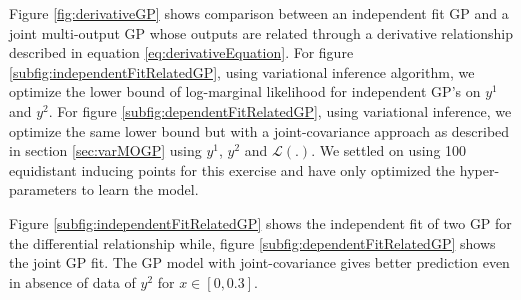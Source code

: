 Figure \ref{fig:derivativeGP} shows comparison between an independent fit GP and a joint multi-output GP whose outputs are related through a derivative relationship described in equation \ref{eq:derivativeEquation}. For figure \ref{subfig:independentFitRelatedGP}, using variational inference algorithm, we optimize the lower bound of log-marginal likelihood for independent GP's on \(y^{1}\) and \(y^{2}\). For figure \ref{subfig:dependentFitRelatedGP}, using variational inference, we optimize the same lower bound but with a joint-covariance approach as described in section \ref{sec:varMOGP} using \(y^{1}\), \(y^{2}\) and \(\mathcal{L}(.)\). We settled on using 100 equidistant inducing points for this exercise \cite{icpram16Ankit} and have only optimized the hyper-parameters to learn the model. 

Figure \ref{subfig:independentFitRelatedGP} shows the independent fit of two GP for the differential relationship while, figure \ref{subfig:dependentFitRelatedGP} shows the joint GP fit. The GP model with joint-covariance gives better prediction even in absence of data of \(y^{2}\) for \(x \in [0, 0.3]\).

